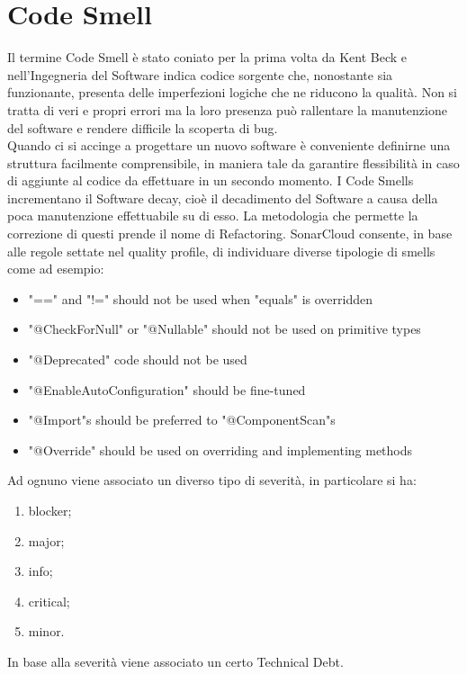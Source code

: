\section{Code Smell}
Il termine Code Smell è stato coniato per la prima volta da Kent Beck e nell’Ingegneria del Software indica codice sorgente che, nonostante sia funzionante, presenta delle imperfezioni logiche che ne riducono la qualità. Non si tratta di veri e propri errori ma la loro presenza può rallentare la manutenzione del software e rendere difficile la  scoperta di bug. \\
Quando ci si accinge a progettare un nuovo software è conveniente definirne una struttura facilmente comprensibile, in maniera tale da garantire flessibilità in caso di aggiunte al codice da effettuare in un secondo momento. I Code Smells incrementano il Software decay, cioè il decadimento del Software a causa della poca manutenzione effettuabile su di esso. La metodologia che permette la correzione di questi prende il nome di Refactoring. 
SonarCloud consente, in base alle regole settate nel quality profile, di individuare diverse tipologie di smells come ad esempio:
\begin{itemize}
\item "==" and "!=" should not be used when "equals" is overridden
\item "@CheckForNull" or "@Nullable" should not be used on primitive types
\item "@Deprecated" code should not be used
\item "@EnableAutoConfiguration" should be fine-tuned
\item "@Import"s should be preferred to "@ComponentScan"s
\item "@Override" should be used on overriding and implementing methods
\end{itemize}
Ad ognuno viene associato un diverso tipo di severità, in particolare si ha:
\begin{enumerate}
\item blocker;
\item major;
\item info;
\item critical;
\item minor.
\end{enumerate}
In base alla severità viene associato un certo Technical Debt.